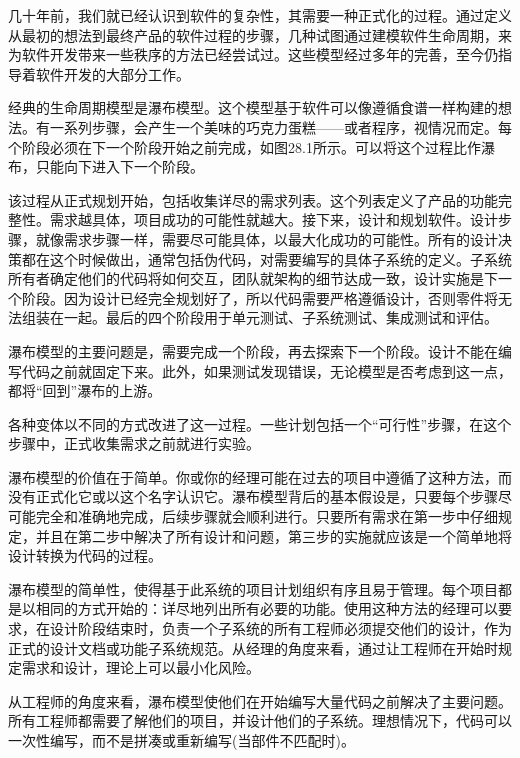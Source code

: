 
几十年前，我们就已经认识到软件的复杂性，其需要一种正式化的过程。通过定义从最初的想法到最终产品的软件过程的步骤，几种试图通过建模软件生命周期，来为软件开发带来一些秩序的方法已经尝试过。这些模型经过多年的完善，至今仍指导着软件开发的大部分工作。


经典的生命周期模型是瀑布模型。这个模型基于软件可以像遵循食谱一样构建的想法。有一系列步骤，会产生一个美味的巧克力蛋糕——或者程序，视情况而定。每个阶段必须在下一个阶段开始之前完成，如图28.1所示。可以将这个过程比作瀑布，只能向下进入下一个阶段。


该过程从正式规划开始，包括收集详尽的需求列表。这个列表定义了产品的功能完整性。需求越具体，项目成功的可能性就越大。接下来，设计和规划软件。设计步骤，就像需求步骤一样，需要尽可能具体，以最大化成功的可能性。所有的设计决策都在这个时候做出，通常包括伪代码，对需要编写的具体子系统的定义。子系统所有者确定他们的代码将如何交互，团队就架构的细节达成一致，设计实施是下一个阶段。因为设计已经完全规划好了，所以代码需要严格遵循设计，否则零件将无法组装在一起。最后的四个阶段用于单元测试、子系统测试、集成测试和评估。

瀑布模型的主要问题是，需要完成一个阶段，再去探索下一个阶段。设计不能在编写代码之前就固定下来。此外，如果测试发现错误，无论模型是否考虑到这一点，都将“回到”瀑布的上游。

各种变体以不同的方式改进了这一过程。一些计划包括一个“可行性”步骤，在这个步骤中，正式收集需求之前就进行实验。


瀑布模型的价值在于简单。你或你的经理可能在过去的项目中遵循了这种方法，而没有正式化它或以这个名字认识它。瀑布模型背后的基本假设是，只要每个步骤尽可能完全和准确地完成，后续步骤就会顺利进行。只要所有需求在第一步中仔细规定，并且在第二步中解决了所有设计和问题，第三步的实施就应该是一个简单地将设计转换为代码的过程。

瀑布模型的简单性，使得基于此系统的项目计划组织有序且易于管理。每个项目都是以相同的方式开始的：详尽地列出所有必要的功能。使用这种方法的经理可以要求，在设计阶段结束时，负责一个子系统的所有工程师必须提交他们的设计，作为正式的设计文档或功能子系统规范。从经理的角度来看，通过让工程师在开始时规定需求和设计，理论上可以最小化风险。

从工程师的角度来看，瀑布模型使他们在开始编写大量代码之前解决了主要问题。所有工程师都需要了解他们的项目，并设计他们的子系统。理想情况下，代码可以一次性编写，而不是拼凑或重新编写(当部件不匹配时)。


